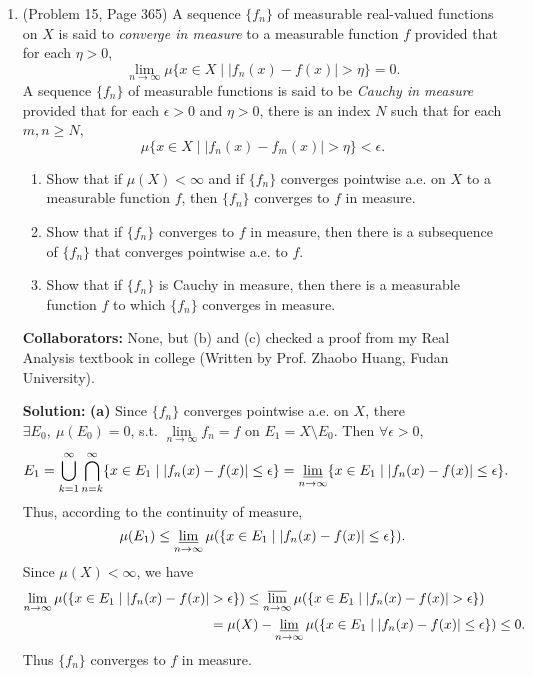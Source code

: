 \documentclass{article}%
\begin{document}
\begin{enumerate}
\item  (Problem 15, Page 365)  A sequence $\{f_n\}$ of measurable real-valued functions on $X$ is said to \emph{converge in measure} to a measurable function $f$  provided that for each $\eta > 0$, \[
\lim_{n\to \infty} \mu\{x\in X \mid |f_n(x) - f(x)|>\eta \} = 0.\]A sequence $\{f_n\}$ of measurable functions is said to be \emph{Cauchy in measure} provided that for each $\epsilon > 0$ and $\eta > 0$, there is an index $N$ such that for each $m,n\geq N$, \[
\mu\{x\in X \mid |f_n(x) - f_m(x)| > \eta \} < \epsilon.\]
\begin{enumerate}
\item Show that if $\mu(X)< \infty$ and if $\{f_n\}$ converges pointwise a.e. on $X$ to a measurable function $f$, then $\{f_n\}$ converges to $f$ in measure.
\item Show that if $\{f_n\}$ converges to $f$ in measure, then there is a subsequence of $\{f_n\}$ that converges pointwise a.e. to $f$.
\item Show that if $\{f_n\}$ is Cauchy in measure, then there is a measurable function $f$ to which $\{f_n\}$ converges in measure.
\end{enumerate}

\bigskip
\textbf{Collaborators:} None, but (b) and (c) checked a proof from my Real Analysis textbook in college (Written by Prof. Zhaobo Huang, Fudan University).
\smallskip
 
\textbf{Solution:}
\textbf{(a)} Since $\{f_n\}$ converges pointwise a.e. on $X$, there $\exists E_0, ~\mu(E_0) = 0$, s.t. $\lim\limits_{n\to\infty}f_n = f$ on $E_1 = X\setminus E_0$. Then $\forall \epsilon > 0$,
$$
E_1 = \bigcup_{k=1}^{\infty} \bigcap_{n=k}^{\infty} \{x\in E_1\mid |f_n(x)-f(x)| \le \epsilon\} = \varliminf_{n\to\infty} \{x\in E_1\mid |f_n(x)-f(x)| \le \epsilon\}.
$$
Thus, according to the continuity of measure, 
$$
\mu(E_1) \le \varliminf_{n\to\infty} \mu(\{x\in E_1\mid |f_n(x)-f(x)| \le \epsilon\}).
$$
Since $\mu(X) < \infty$, we have
$$
\begin{aligned}
\lim_{n\to\infty} \mu(\{x\in E_1\mid |f_n(x)-f(x)| &> \epsilon\}) \le \varlimsup_{n\to\infty} \mu(\{x\in E_1\mid |f_n(x)-f(x)| > \epsilon\}) \\
&= \mu(X) - \varliminf_{n\to\infty} \mu(\{x\in E_1\mid |f_n(x)-f(x)| \le \epsilon\}) \le 0.
\end{aligned}
$$
Thus $\{f_n\}$ converges to $f$ in measure. 


\end{enumerate}
\end{document}
